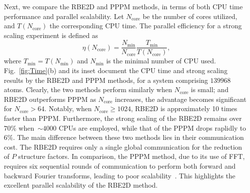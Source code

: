 Next, we compare the RBE2D and PPPM methods, in terms of both
CPU time performance and  {parallel} scalability. %
Let  {$N_{\text{core}}$ be the number of cores utilized}, and $T(N_{\text{core}})$ the corresponding CPU time.  {The parallel efficiency for a strong scaling experiment is defined as}
\begin{equation}\label{eq::etau}
\eta(N_{\text{core}})=\frac{N_{\text{min}}}{N_{\text{core}}}\frac{T_{\text{min}}}{T(N_{\text{core}})},
\end{equation}
where $T_{\text{min}}=T(N_{\text{min}})$ and $N_{\text{min}}$ is the minimal number of CPU used. 
Fig.~\ref{fig:Time}(b) and its inset document the CPU time and strong scaling results by the RBE2D and PPPM methods, for a system comprising $139968$ atoms. Clearly,
the two methods perform similarly when $N_{\text{core}}$ is small; and RBE2D outperforms PPPM as $N_{\text{core}}$ increases, the advantage becomes significant for $N_{\text{core}}>64$. Notably,
when $N_{\text{core}}\geq 1024$, RBE2D is approximately 10 times faster than PPPM. 
Furthermore, the strong scaling of the RBE2D remains over $70\%$ when~$\sim 4000$ CPUs are employed, while that of the PPPM drops raplidly to $6\%$. 
 {The main difference between these two methods lies in their communication cost. The RBE2D requires only a single global communication for the reduction of $P$ structure factors. In comparison, the PPPM method, due to its use of FFT, requires six sequential rounds of communication to perform both forward and backward Fourier transforms, leading to poor scalability~\cite{fftscalability,arnold2013comparison}.} This highlights the excellent parallel scalability of the RBE2D method. 
